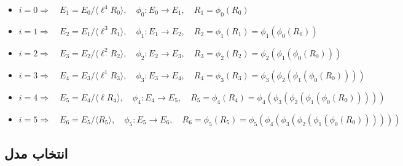 \documentclass[12pt,a4paper]{article}
\begin{document}
\begin{itemize}
	
	\item[] {}
	\begin{flushleft}
		$
		i=0 \Rightarrow \quad 
		E_1 = E_0 / \langle \ell^{4}R_0 \rangle , \quad 
		\phi_0 : E_0 \rightarrow E_1 , \quad 
		R_1 = \phi_0(R_0)
		$
	\end{flushleft}
	
	\item[] {}
	\begin{flushleft}
		$
		i=1 \Rightarrow \quad 
		E_2 = E_1 / \langle \ell^{3}R_1 \rangle , \quad 
		\phi_1 : E_1 \rightarrow E_2 , \quad 	R_2 = \phi_1(R_1) = \phi_1(\phi_0(R_0))
		$
	\end{flushleft}

	\item[] {}
	\begin{flushleft}
		$
		i=2 \Rightarrow \quad 
		E_3 = E_2 / \langle \ell^{2}R_2 \rangle , \quad 
		\phi_2 : E_2 \rightarrow E_3 , \quad 	R_3 = \phi_2(R_2) = \phi_2(\phi_1(\phi_0(R_0)))
		$
	\end{flushleft}

	\item[] {}
	\begin{flushleft}
		$
		i=3 \Rightarrow \quad 
		E_4 = E_3 / \langle \ell^{1}R_3 \rangle , \quad 
		\phi_3 : E_3 \rightarrow E_4 , \quad 	R_4 = \phi_3(R_3) = \phi_3(\phi_2(\phi_1(\phi_0(R_0))))
		$
	\end{flushleft}

	\item[] {}
	\begin{flushleft}
		$
		i=4 \Rightarrow \quad 
		E_5 = E_4 / \langle \ell R_4 \rangle , \quad 
		\phi_4 : E_4 \rightarrow E_5 , \quad 	R_5 = \phi_4(R_4) = 
		\phi_4(\phi_3(\phi_2(\phi_1(\phi_0(R_0)))))
		$
	\end{flushleft}

	\item[] {}
	\begin{flushleft}
		$
		i=5 \Rightarrow \quad 
		E_6 = E_5 / \langle R_5 \rangle , \quad 
		\phi_5 : E_5 \rightarrow E_6 , \quad 	R_6 = \phi_5(R_5) = 
		\phi_5(\phi_4(\phi_3(\phi_2(\phi_1(\phi_0(R_0))))))
		$
	\end{flushleft}
			
\end{itemize}

\subsection{\bf انتخاب مدل}\label{model_choice}
\end{document}
